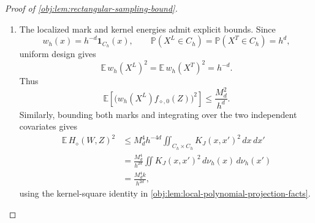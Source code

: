 \documentclass[11pt]{article}
\begin{document}
\begin{proof}[Proof of \cref{obj:lem:rectangular-sampling-bound}]
\begin{enumerate}
Use the coordinate tags
\[
\diamond\in
\bigl(\{\mathrm R\}\times\mathcal U_d\bigr)
\sqcup
\bigl(\{\mathrm Q\}\times\mathcal U_d\times\mathcal U_d\bigr).
\]
For each tag, define the three mark functions by
\[
\begin{array}{c|ccc}
\diamond
& f_{\diamond,0}(Z)
& f_{\diamond,T}(W)
& f_{\diamond,L}(Z)\\ \hline
(\mathrm R,u)
& r_u(X^L)A^LY^L
& r_u(X^T)A^T
& Y^L\\
(\mathrm Q,u,v)
& r_u(X^L)r_v(X^L)A^L
& r_u(X^T)A^T
& r_v(X^L)A^L
\end{array}
\]
on the full record domains displayed above. Binary marks have absolute value at most one. The coarse-coordinate bound from the preceding step therefore gives
\[
\begin{aligned}
|f_{\diamond,0}(Z)|&\le M_d &&(X^L\in C_h),\\
|f_{\diamond,T}(W)|&\le M_d &&(X^T\in C_h),\\
|f_{\diamond,L}(Z)|&\le M_d &&(X^L\in C_h).
\end{aligned}
\]
Define
\[
H_\diamond(W,Z)
=w_h(X^T)w_h(X^L)K_J(X^T,X^L)
 f_{\diamond,T}(W)f_{\diamond,L}(Z),
\]
\[
\widehat S_\diamond
=\frac1\ell\sum_{j\in I_L}
 w_h(X_j)f_{\diamond,0}(Z_j),
\qquad
\widehat H_\diamond
=\frac1{t\ell}\sum_{i\in I_T}\sum_{j\in I_L}
 H_\diamond(W_i,Z_j),
\qquad
F_\diamond=\widehat S_\diamond-\widehat H_\diamond.
\]
These expressions vanish termwise whenever a localization weight is zero. The rectangular formulas in \cref{obj:def:moments} give exactly
\[
F_{(\mathrm R,u)}=(\widehat R_{h,J})_u,
\qquad
F_{(\mathrm Q,u,v)}
=(\widehat Q^{\mathrm{raw}}_{h,J})_{uv}.
\]
In the response identity, expanding the empirical projection gives the rectangular formula on \(C_h\); outside \(C_h\), its defining zero value and the zero localization weight give the same identity.

\item The localized mark and kernel energies admit explicit bounds. Since
\[
w_h(x)=h^{-d}\mathbf1_{C_h}(x),
\qquad
\mathbb P(X^L\in C_h)=\mathbb P(X^T\in C_h)=h^d,
\]
uniform design gives
\[
\mathbb E\,w_h(X^L)^2
=\mathbb E\,w_h(X^T)^2=h^{-d}.
\]
Thus
\[
\mathbb E\!\left[
 \bigl(w_h(X^L)f_{\diamond,0}(Z)\bigr)^2
 \right]\le \frac{M_d^2}{h^d}.
\]
Similarly, bounding both marks and integrating over the two independent covariates gives
\[
\begin{aligned}
\mathbb E\,H_\diamond(W,Z)^2
&\le M_d^4h^{-4d}
 \iint_{C_h\times C_h}K_J(x,x')^2\,dx\,dx'\\
&=\frac{M_d^4}{h^{2d}}
 \iint K_J(x,x')^2\,d\nu_h(x)\,d\nu_h(x')\\
&=\frac{M_d^4k}{h^{2d}},
\end{aligned}
\]
using the kernel-square identity in
\cref{obj:lem:local-polynomial-projection-facts}.


\end{enumerate}
\end{proof}
\end{document}
